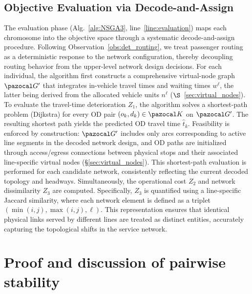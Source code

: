 \documentclass[a4paper,fleqn]{cas-sc}
\begin{document}
\subsection{Objective Evaluation via Decode-and-Assign}
\label{sec:evaluation}
The evaluation phase (Alg.~\ref{alg:NSGA3}, line~\ref{line:evaluation}) maps each chromosome into the objective space through a systematic decode-and-assign procedure. Following Observation~\ref{obs:det_routing}, we treat passenger routing as a deterministic response to the network configuration, thereby decoupling routing behavior from the upper-level network design decisions. 
%
For each individual, the algorithm first constructs a comprehensive virtual-node graph $\pazocal G'$ that integrates in-vehicle travel times and waiting times $w^\ell$, the latter being derived from the allocated vehicle units $n^\ell$ ($\S$~\ref{sec:virtual_nodes}).
%
To evaluate the travel-time deterioration $Z_1$, the algorithm solves a shortest-path problem (Dijkstra) for every OD pair $(o_k, d_k) \in \pazocal K$ on $\pazocal G'$. The resulting shortest path yields the predicted OD travel time $\hat t_k$. Feasibility is enforced by construction: $\pazocal G'$ includes only arcs corresponding to active line segments in the decoded network design, and OD paths are initialized through access/egress connections between physical stops and their associated line-specific virtual nodes (\S\ref{sec:virtual_nodes}).
%
This shortest-path evaluation is performed for each candidate network, consistently reflecting the current decoded topology and headways.
%
Simultaneously, the operational cost $Z_2$ and network dissimilarity $Z_3$ are computed. Specifically, $Z_3$ is quantified using a line-specific Jaccard similarity, where each network element is defined as a triplet $(\min(i,j), \max(i,j), \ell)$. This representation ensures that identical physical links served by different lines are treated as distinct entities, accurately capturing the topological shifts in the service network.


\section{Proof and discussion of pairwise stability}
\label{app:temporal_stability_proof}

\end{document}
